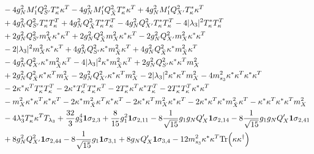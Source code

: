 {\begin{align}
 &-4 g_{N}^{2} M_1' Q_{S'}^{2} {T_{\kappa}^*  \kappa^{T}} -4 g_{N}^{2} M_1' Q_{\bar{X}}^{2} {T_{\kappa}^*  \kappa^{T}} +4 g_{N}^{2} M_1' Q_{X'}^{2} {T_{\kappa}^*  \kappa^{T}} \nonumber \\ 
 &+4 g_{N}^{2} Q_{S'}^{2} {T_{\kappa}^*  T_{\kappa}^{T}} +4 g_{N}^{2} Q_{\bar{X}}^{2} {T_{\kappa}^*  T_{\kappa}^{T}} -4 g_{N}^{2} Q_{X'}^{2} {T_{\kappa}^*  T_{\kappa}^{T}} -4 |\lambda_3|^2 {T_{\kappa}^*  T_{\kappa}^{T}} \nonumber \\ 
 &+2 g_{N}^{2} Q_{S'}^{2} {m_{X}^2  \kappa^*  \kappa^{T}} +2 g_{N}^{2} Q_{\bar{X}}^{2} {m_{X}^2  \kappa^*  \kappa^{T}} -2 g_{N}^{2} Q_{X'}^{2} {m_{X}^2  \kappa^*  \kappa^{T}} \nonumber \\ 
 &-2 |\lambda_3|^2 {m_{X}^2  \kappa^*  \kappa^{T}} +4 g_{N}^{2} Q_{S'}^{2} {\kappa^*  m_{\bar{X}}^2  \kappa^{T}} +4 g_{N}^{2} Q_{\bar{X}}^{2} {\kappa^*  m_{\bar{X}}^2  \kappa^{T}} \nonumber \\ 
 &-4 g_{N}^{2} Q_{X'}^{2} {\kappa^*  m_{\bar{X}}^2  \kappa^{T}} -4 |\lambda_3|^2 {\kappa^*  m_{\bar{X}}^2  \kappa^{T}} +2 g_{N}^{2} Q_{S'}^{2} {\kappa^*  \kappa^{T}  m_{X}^2} \nonumber \\ 
 &+2 g_{N}^{2} Q_{\bar{X}}^{2} {\kappa^*  \kappa^{T}  m_{X}^2} -2 g_{N}^{2} Q_{X'}^{2} {\kappa^*  \kappa^{T}  m_{X}^2} -2 |\lambda_3|^2 {\kappa^*  \kappa^{T}  m_{X}^2} -4 m_{s_3}^2 {\kappa^*  \kappa^{T}  \kappa^*  \kappa^{T}} \nonumber \\ 
 &-2 {\kappa^*  \kappa^{T}  T_{\kappa}^*  T_{\kappa}^{T}} -2 {\kappa^*  T_{\kappa}^{T}  T_{\kappa}^*  \kappa^{T}} -2 {T_{\kappa}^*  \kappa^{T}  \kappa^*  T_{\kappa}^{T}} -2 {T_{\kappa}^*  T_{\kappa}^{T}  \kappa^*  \kappa^{T}} \nonumber \\ 
 &- {m_{X}^2  \kappa^*  \kappa^{T}  \kappa^*  \kappa^{T}} -2 {\kappa^*  m_{\bar{X}}^2  \kappa^{T}  \kappa^*  \kappa^{T}} -2 {\kappa^*  \kappa^{T}  m_{X}^2  \kappa^*  \kappa^{T}} -2 {\kappa^*  \kappa^{T}  \kappa^*  m_{\bar{X}}^2  \kappa^{T}} - {\kappa^*  \kappa^{T}  \kappa^*  \kappa^{T}  m_{X}^2} \nonumber \\ 
 &-4 \lambda_3^* {T_{\kappa}^*  \kappa^{T}} T_{\lambda_3} +\frac{32}{3} g_{3}^{4} {\bf 1} \sigma_{2,3} +\frac{8}{15} g_{1}^{2} {\bf 1} \sigma_{2,11} -8 \frac{1}{\sqrt{15}} g_1 g_N Q_X' {\bf 1} \sigma_{2,14} -8 \frac{1}{\sqrt{15}} g_1 g_N Q_X' {\bf 1} \sigma_{2,41} \nonumber \\ 
 &+8 g_{N}^{2} Q_{X'}^{2} {\bf 1} \sigma_{2,44} -8 \frac{1}{\sqrt{15}} g_1 {\bf 1} \sigma_{3,1} +8 g_N Q_X' {\bf 1} \sigma_{3,4} -12 m_{s_3}^2 {\kappa^*  \kappa^{T}} \mbox{Tr}\Big({\kappa  \kappa^{\dagger}}\Big) \nonumber \\ 

\end{align}}
